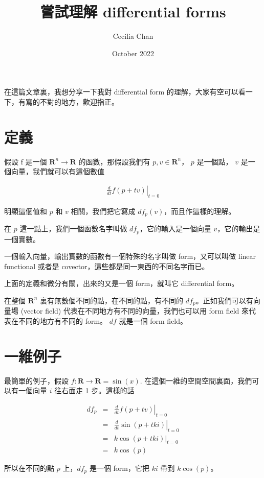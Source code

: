 \documentclass{article}
\title{嘗試理解 differential forms}
\author{Cecilia Chan}
\date{October 2022}
\begin{document}
\maketitle
在這篇文章裏，我想分享一下我對 differential form 的理解，大家有空可以看一下，有寫的不對的地方，歡迎指正。

\section{定義}
假設 f 是一個 $ \mathbf{R}^n \to \mathbf{R} $ 的函數，那假設我們有 $ p, v \in \mathbf{R}^n $， $ p $ 是一個點， $ v $ 是一個向量，我們就可以有這個數值

\begin{eqnarray*}
  \left. \frac{d}{dt} f(p + tv)\right|_{t = 0}
\end{eqnarray*}

明顯這個值和 $ p $ 和 $ v $ 相關，我們把它寫成 $ df_p(v) $，而且作這樣的理解。

在 $ p $ 這一點上，我們一個函數名字叫做 $ df_p $，它的輸入是一個向量 $ v $，它的輸出是一個實數。

一個輸入向量，輸出實數的函數有一個特殊的名字叫做 form，又可以叫做 linear functional 或者是 covector，這些都是同一東西的不同名字而已。

上面的定義和微分有關，出來的又是一個 form，就叫它 differential form。

在整個 $ \mathbf{R}^n $ 裏有無數個不同的點，在不同的點，有不同的 $ df_p $。正如我們可以有向量場 (vector field) 代表在不同地方有不同的向量，我們也可以用 form field 來代表在不同的地方有不同的 form。 $ df $ 就是一個 form field。

\section{一維例子}
最簡單的例子，假設 $ f: \mathbf{R} \to \mathbf{R} = \sin(x) $. 在這個一維的空間空間裏面，我們可以有一個向量 $ i $ 往右面走 1 步。這樣的話

\begin{eqnarray*}
  df_p &=& \left. \frac{d}{dt} f(p + tv)\right|_{t = 0} \\
       &=& \left. \frac{d}{dt} \sin(p + tki)\right|_{t = 0} \\
       &=& \left. k\cos(p + tki)\right|_{t = 0} \\
       &=& k \cos(p)
\end{eqnarray*}

所以在不同的點 $ p $ 上，$ df_p $ 是一個 form，它把 $ ki $ 帶到 $ k \cos(p) $。
\end{document}
